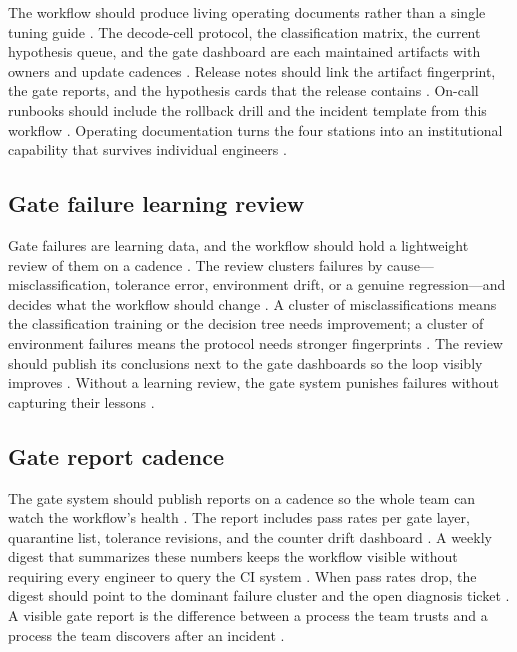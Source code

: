 The workflow should produce living operating documents rather than a single tuning guide \citep{chen2020compilerbasedhardw,memoryfloor2026,taxbreak2026}. The decode-cell protocol, the classification matrix, the current hypothesis queue, and the gate dashboard are each maintained artifacts with owners and update cadences \citep{patel2025llminference,memoryfloor2026}. Release notes should link the artifact fingerprint, the gate reports, and the hypothesis cards that the release contains \citep{chen2020compilerbasedhardw,taxbreak2026}. On-call runbooks should include the rollback drill and the incident template from this workflow \citep{memoryfloor2026,patel2025llminference}. Operating documentation turns the four stations into an institutional capability that survives individual engineers \citep{chen2020compilerbasedhardw,memoryfloor2026}.

\subsection{Gate failure learning review}

Gate failures are learning data, and the workflow should hold a lightweight review of them on a cadence \citep{chen2020compilerbasedhardw,memoryfloor2026,patel2025llminference}. The review clusters failures by cause—misclassification, tolerance error, environment drift, or a genuine regression—and decides what the workflow should change \citep{taxbreak2026,memoryfloor2026}. A cluster of misclassifications means the classification training or the decision tree needs improvement; a cluster of environment failures means the protocol needs stronger fingerprints \citep{chen2020compilerbasedhardw,patel2025llminference}. The review should publish its conclusions next to the gate dashboards so the loop visibly improves \citep{memoryfloor2026,taxbreak2026}. Without a learning review, the gate system punishes failures without capturing their lessons \citep{patel2025llminference,memoryfloor2026}.

\subsection{Gate report cadence}

The gate system should publish reports on a cadence so the whole team can watch the workflow's health \citep{chen2020compilerbasedhardw,memoryfloor2026,taxbreak2026}. The report includes pass rates per gate layer, quarantine list, tolerance revisions, and the counter drift dashboard \citep{patel2025llminference,memoryfloor2026}. A weekly digest that summarizes these numbers keeps the workflow visible without requiring every engineer to query the CI system \citep{chen2020compilerbasedhardw,patel2025llminference}. When pass rates drop, the digest should point to the dominant failure cluster and the open diagnosis ticket \citep{memoryfloor2026,taxbreak2026}. A visible gate report is the difference between a process the team trusts and a process the team discovers after an incident \citep{patel2025llminference,memoryfloor2026}.

